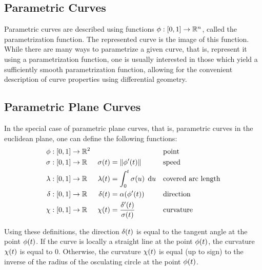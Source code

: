 \documentclass[a4paper]{article}
\begin{document}
		\subsection{Parametric Curves}
		\label{section:parametric_curves}

			Parametric curves are described using functions \(\phi : \left[ 0,1 \right] \rightarrow \mathbb{R}^{n}\), called the parametrization function. The represented curve is the image of this function. While there are many ways to parametrize a given curve, that is, represent it using a parametrization function, one is usually interested in those which yield a sufficiently smooth parametrization function, allowing for the convenient description of curve properties using differential geometry.

		\subsection{Parametric Plane Curves}
		\label{section:parametric_plane_curves}

			In the special case of parametric plane curves, that is, parametric curves in the euclidean plane, one can define the following functions:
			\begin{align*}
				\phi    & : \function{\unit}{\R{2}} &                    &                                                && \text{point}\\
				\sigma  & : \function{\unit}{\RR}   & \apply{\sigma}{t}  & = \xn{\apply{\phi'}{t}}                        && \text{speed}\\
				\lambda & : \function{\unit}{\RR}   & \apply{\lambda}{t} & = \integral{0}{t}{\apply{\sigma}{u}}{u}        && \text{covered arc length}\\
				\delta  & : \function{\unit}{\RR}   & \apply{\delta}{t}  & = \apply{\alpha}{\apply{\phi'}{t}}             && \text{direction}\\
				\chi    & : \function{\unit}{\RR}   & \apply{\chi}{t}    & = \frac{\apply{\delta'}{t}}{\apply{\sigma}{t}} && \text{curvature}
			\end{align*}

			Using these definitions, the direction \(\delta\!\left( t \right)\) is equal to the tangent angle at the point \(\phi\!\left( t \right)\). If the curve is locally a straight line at the point \(\phi\!\left( t \right)\), the curvature \(\chi\!\left( t \right)\) is equal to \(0\). Otherwise, the curvature \(\chi\!\left( t \right)\) is equal (up to sign) to the inverse of the radius of the osculating circle at the point \(\phi\!\left( t \right)\).
\end{document}
